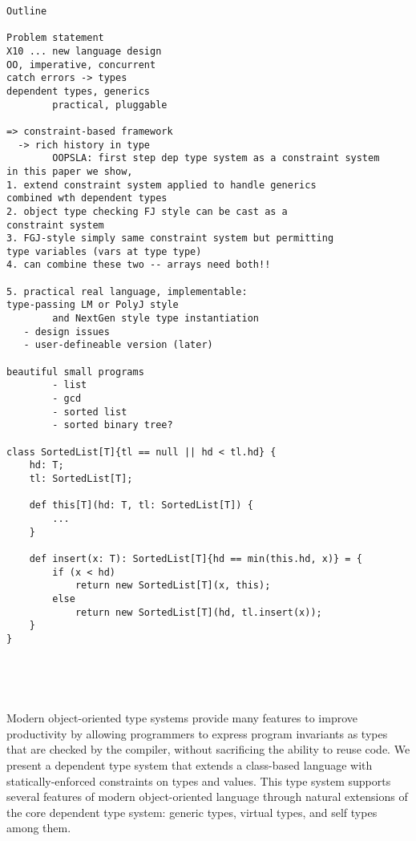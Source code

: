 \begin{verbatim}
Outline

Problem statement
X10 ... new language design
OO, imperative, concurrent
catch errors -> types
dependent types, generics
        practical, pluggable

=> constraint-based framework
  -> rich history in type
        OOPSLA: first step dep type system as a constraint system
in this paper we show,
1. extend constraint system applied to handle generics
combined wth dependent types
2. object type checking FJ style can be cast as a
constraint system
3. FGJ-style simply same constraint system but permitting
type variables (vars at type type)
4. can combine these two -- arrays need both!!

5. practical real language, implementable:
type-passing LM or PolyJ style
        and NextGen style type instantiation
   - design issues
   - user-defineable version (later)

beautiful small programs
        - list
        - gcd
        - sorted list
        - sorted binary tree?

class SortedList[T]{tl == null || hd < tl.hd} {
    hd: T;
    tl: SortedList[T];

    def this[T](hd: T, tl: SortedList[T]) {
        ...
    }

    def insert(x: T): SortedList[T]{hd == min(this.hd, x)} = {
        if (x < hd)
            return new SortedList[T](x, this);
        else
            return new SortedList[T](hd, tl.insert(x));
    }
}





\end{verbatim}








Modern object-oriented type systems provide 
many features to improve productivity by 
allowing programmers to express program
invariants as types that are
checked by the compiler, without sacrificing the ability to
reuse code.
We present a dependent type system
that extends a class-based language with
statically-enforced constraints on types and values.
This type system 
supports several features of modern object-oriented 
language through natural extensions of the core dependent type
system: generic types, virtual types, and self types
among them.

